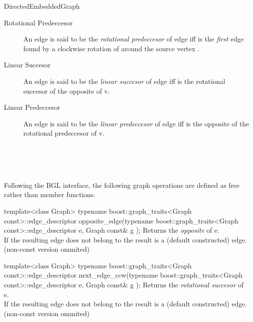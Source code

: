 \begin{ccRefConcept}{DirectedEmbeddedGraph}
\begin{description}
\item[Rotational Predeccesor] 
An edge  is said to be the {\em rotational predeccesor}
of edge  iff  is the {\em first} edge found by 
a clockwise rotation of  around the source vertex .

\item[Linear Succesor] 
An edge  is said to be the {\em linear succesor} of edge 
 iff  is the rotational succesor of the opposite
of v.
 
\item[Linear Predeccesor] 
An edge  is said to be the {\em linear predeccesor} of edge 
 iff  is the opposite of the rotational predeccesor
of v.

\end{description}

\ccRefines
{}\\
\\
\\

\ccTypes

\ccOperations

Following the BGL interface, the following graph operations are defined as free rather than member functions.

  \ccFunction
  {template<class Graph>
  typename boost::graph_traits<Graph const>::edge_descriptor 
  opposite_edge(typename boost::graph_traits<Graph const>::edge_descriptor e, Graph const& g );
  }
  {Returns the {\em opposite} of e.\\
  If the resulting edge does not belong to  the result is a  (default constructed) edge.\\
  (non-const version ommited)
  }
  
  \ccFunction
  {template<class Graph>
  typename boost::graph_traits<Graph const>::edge_descriptor 
  next_edge_ccw(typename boost::graph_traits<Graph const>::edge_descriptor e, Graph const& g );
  }
  {Returns the {\em rotational succesor} of e.\\
  If the resulting edge does not belong to  the result is a  (default constructed) edge.\\
  (non-const version ommited)
  }
  

\end{ccRefConcept}
